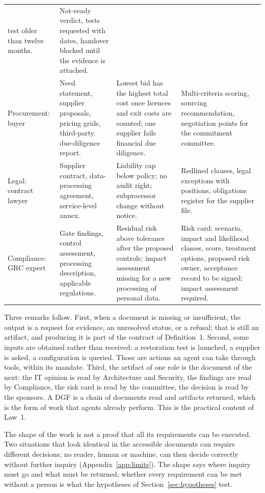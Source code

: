 \begin{table}[!htb]
\begin{tabularx}{\linewidth}{@{}P{2.4cm}P{3.5cm}LL@{}}
test older than twelve months. & Not-ready verdict, tests requested with dates, handover blocked until
the evidence is attached.\\
Procurement: buyer & Need statement, supplier proposals, pricing grids, third-party due-diligence report.
& Lowest bid has the highest total cost once licences and exit costs are counted; one supplier fails
financial due diligence. & Multi-criteria scoring, sourcing recommendation, negotiation points for the
commitment committee.\\
Legal: contract lawyer & Supplier contract, data-processing agreement, service-level annex. & Liability
cap below policy; no audit right; subprocessor change without notice. & Redlined clauses, legal
exceptions with positions, obligations register for the supplier file.\\
Compliance: GRC expert & Gate findings, control assessment, processing description, applicable
regulations. & Residual risk above tolerance after the proposed controls; impact assessment missing for a
new processing of personal data. & Risk card: scenario, impact and likelihood classes, score, treatment
options, proposed risk owner, acceptance record to be signed; impact assessment required.\\
\bottomrule
\end{tabularx}
\end{table}

Three remarks follow. First, when a document is missing or insufficient, the output is a request for
evidence, an unresolved status, or a refusal; that is still an artifact, and producing it is part of the
contract of Definition~1. Second, some inputs are obtained rather than received: a restoration test is
launched, a supplier is asked, a configuration is queried. Those are actions an agent can take through
tools, within its mandate. Third, the artifact of one role is the document of the next: the
IT opinion is read by Architecture and Security, the findings are read by Compliance, the risk card is read
by the committee, the decision
is read by the sponsors. A DGF is a chain of documents read and artifacts returned, which is the form
of work that agents already perform. This is the practical content of Law~1.

The shape of the work is not a proof that all its requirements can be executed. Two situations that
look identical in the accessible documents can require different decisions; no reader, human or
machine, can then decide correctly without further inquiry (Appendix~\ref{app:limits}). The shape says
where inquiry must go and what must be returned; whether every requirement can be met without a person
is what the hypotheses of Section~\ref{sec:hypotheses} test.

